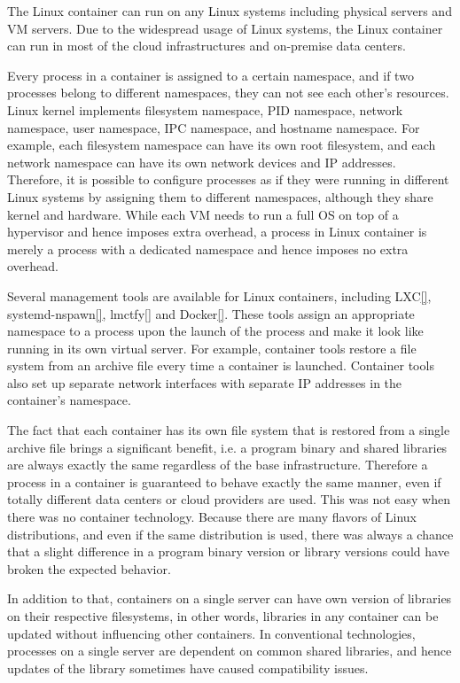 The Linux container can run on any Linux systems including physical servers and VM servers.
Due to the widespread usage of Linux systems, the Linux container can run in most of the cloud infrastructures and on-premise data centers.

Every process in a container is assigned to a certain namespace, and if two processes belong to different namespaces, they can not see each other's resources. 
Linux kernel implements filesystem namespace, PID namespace, network namespace, user namespace, IPC namespace, and hostname namespace. 
For example, each filesystem namespace can have its own root filesystem, and each network namespace can have its own network devices and IP addresses.
Therefore, it is possible to configure processes as if they were running in different Linux systems by assigning them to different namespaces, although they share kernel and hardware.
While each VM needs to run a full OS on top of a hypervisor and hence imposes extra overhead, a process in Linux container is merely a process with a dedicated namespace and hence imposes no extra overhead.

Several management tools are available for Linux containers, including LXC\ref{}, systemd-nspawn\ref{}, lmctfy\ref{} and Docker\ref{}.
These tools assign an appropriate namespace to a process upon the launch of the process and make it look like running in its own virtual server.
For example, container tools restore a file system from an archive file every time a container is launched. 
Container tools also set up separate network interfaces with separate IP addresses in the container's namespace.

The fact that each container has its own file system that is restored from a single archive file brings a significant benefit, i.e. a program binary and shared libraries are always exactly the same regardless of the base infrastructure.
Therefore a process in a container is guaranteed to behave exactly the same manner, even if totally different data centers or cloud providers are used.
This was not easy when there was no container technology.
Because there are many flavors of Linux distributions, and even if the same distribution is used, there was always a chance that a slight difference in a program binary version or library versions could have broken the expected behavior.

In addition to that, containers on a single server can have own version of libraries on their respective filesystems, in other words, libraries in any container can be updated without influencing other containers.
In conventional technologies, processes on a single server are dependent on common shared libraries, and hence updates of the library sometimes have caused compatibility issues.

